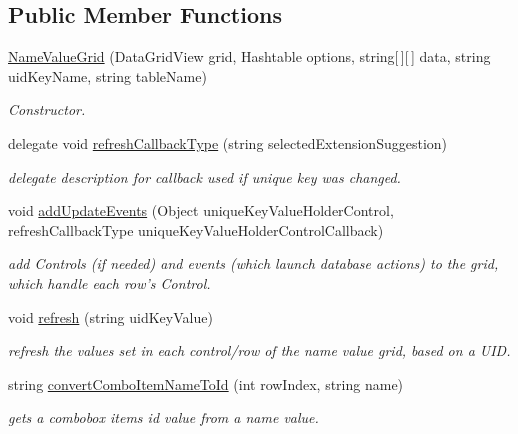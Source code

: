 \subsection*{Public Member Functions}
\begin{DoxyCompactItemize}
\item 
\hyperlink{class_ias_pbx_config_1_1_name_value_grid_af47450cb245bcef5cfb1744191c3e371}{NameValueGrid} (DataGridView grid, Hashtable options, string\mbox{[}$\,$\mbox{]}\mbox{[}$\,$\mbox{]} data, string uidKeyName, string tableName)
\begin{DoxyCompactList}\small\item\em Constructor. \item\end{DoxyCompactList}\item 
delegate void \hyperlink{class_ias_pbx_config_1_1_name_value_grid_acb2383247682f790d011f8840068a252}{refreshCallbackType} (string selectedExtensionSuggestion)
\begin{DoxyCompactList}\small\item\em delegate description for callback used if unique key was changed. \item\end{DoxyCompactList}\item 
void \hyperlink{class_ias_pbx_config_1_1_name_value_grid_a5f999a6912fe2342c2edef12bd6d1e2f}{addUpdateEvents} (Object uniqueKeyValueHolderControl, refreshCallbackType uniqueKeyValueHolderControlCallback)
\begin{DoxyCompactList}\small\item\em add Controls (if needed) and events (which launch database actions) to the grid, which handle each row's Control. \item\end{DoxyCompactList}\item 
void \hyperlink{class_ias_pbx_config_1_1_name_value_grid_a99e4cae8063bc38014c310a90e59b779}{refresh} (string uidKeyValue)
\begin{DoxyCompactList}\small\item\em refresh the values set in each control/row of the name value grid, based on a UID. \item\end{DoxyCompactList}\item 
string \hyperlink{class_ias_pbx_config_1_1_name_value_grid_afa2c2d0522757b0450a5cbbe6a19d526}{convertComboItemNameToId} (int rowIndex, string name)
\begin{DoxyCompactList}\small\item\em gets a combobox items id value from a name value. \item\end{DoxyCompactList}\item 

\end{DoxyCompactItemize}
